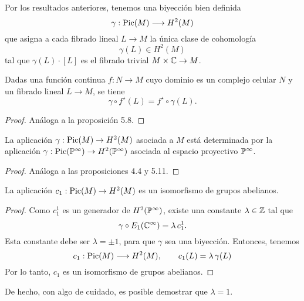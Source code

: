 Por los resultados anteriores, tenemos una biyección bien definida
$$\gamma : \Pic(M) \longrightarrow H^2(M)$$
que asigna a cada fibrado lineal $L \to M$ la única clase de cohomología
$$\gamma(L) \in H^2(M)$$
tal que $\gamma(L) \cdot [L]$ es el fibrado trivial $M \times \C \to M$.

\begin{proposition}[Naturalidad]
Dadas una función continua $f : N \to M$ cuyo dominio es un complejo celular $N$ y un fibrado lineal $L \to M$, se tiene
$$\gamma \circ f^\star(L) = f^\star \circ \gamma(L).$$
\end{proposition}

\begin{proof}
Análoga a la proposición 5.8.
\end{proof}

\begin{proposition}
La aplicación $\gamma : \Pic(M) \to H^2(M)$ asociada a $M$ está determinada por la aplicación $\gamma : \Pic(\P^\infty) \to H^2(\P^\infty)$ asociada al espacio proyectivo $\P^\infty$.
\end{proposition}

\begin{proof}
Análoga a las proposiciones 4.4 y 5.11.
\end{proof}

\begin{theorem}
La aplicación $c_1 : \Pic(M) \to H^2(M)$ es un isomorfismo de grupos abelianos.
\end{theorem}

\begin{proof}
Como $c_1^1$ es un generador de $H^2(\P^\infty)$, existe una constante $\lambda \in \Z$ tal que
$$\gamma \circ E_1(\C^\infty) = \lambda \, c_1^1.$$
Esta constante debe ser $\lambda = \pm 1$, para que $\gamma$ sea una biyección. Entonces, tenemos
$$c_1 : \Pic(M) \longrightarrow H^2(M), \qquad c_1(L) = \lambda \, \gamma(L)$$
Por lo tanto, $c_1$ es un isomorfismo de grupos abelianos.
\end{proof}

\begin{remark}
De hecho, con algo de cuidado, es posible demostrar que $\lambda = 1$.
\end{remark}
